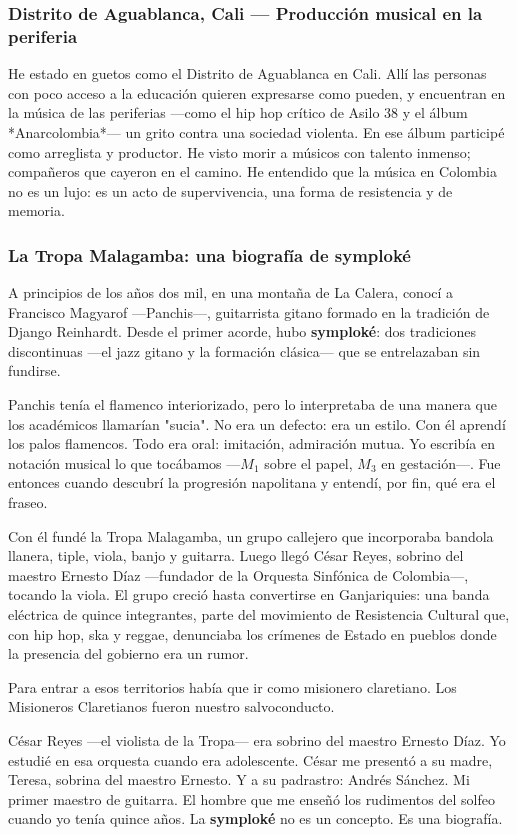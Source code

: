 \documentclass[14pt, a4paper]{article}
\begin{document}
\subsubsection{Distrito de Aguablanca, Cali — Producción musical en la periferia}
\label{aguablanca}
He estado en guetos como el Distrito de Aguablanca en Cali. Allí las
personas con poco acceso a la educación quieren expresarse como
pueden, y encuentran en la música de las periferias —como el hip hop
crítico de Asilo 38 y el álbum *Anarcolombia*— un grito contra una
sociedad violenta. En ese álbum participé como arreglista y productor.
He visto morir a músicos con talento inmenso; compañeros que cayeron
en el camino. He entendido que la música en Colombia no es un lujo:
es un acto de supervivencia, una forma de resistencia y de memoria.
\subsubsection{La Tropa Malagamba: una biografía de \textbf{symploké}}
\label{tropa-malagamba}
A principios de los años dos mil, en una montaña de La Calera, conocí
a Francisco Magyarof —Panchis—, guitarrista gitano formado en la
tradición de Django Reinhardt. Desde el primer acorde, hubo
\textbf{symploké}: dos tradiciones discontinuas —el jazz gitano y la
formación clásica— que se entrelazaban sin fundirse.

Panchis tenía el flamenco interiorizado, pero lo interpretaba de una
manera que los académicos llamarían "sucia". No era un defecto: era
un estilo. Con él aprendí los palos flamencos. Todo era oral:
imitación, admiración mutua. Yo escribía en notación musical lo que
tocábamos —\(M_1\) sobre el papel, \(M_3\) en gestación—. Fue entonces
cuando descubrí la progresión napolitana y entendí, por fin, qué era
el fraseo.

Con él fundé la Tropa Malagamba, un grupo callejero que incorporaba
bandola llanera, tiple, viola, banjo y guitarra. Luego llegó César
Reyes, sobrino del maestro Ernesto Díaz —fundador de la Orquesta
Sinfónica de Colombia—, tocando la viola. El grupo creció hasta
convertirse en Ganjariquies: una banda eléctrica de quince
integrantes, parte del movimiento de Resistencia Cultural que, con
hip hop, ska y reggae, denunciaba los crímenes de Estado en pueblos
donde la presencia del gobierno era un rumor.

Para entrar a esos territorios había que ir como misionero
claretiano. Los Misioneros Claretianos fueron nuestro salvoconducto.

César Reyes —el violista de la Tropa— era sobrino del maestro Ernesto
Díaz. Yo estudié en esa orquesta cuando era adolescente. César me
presentó a su madre, Teresa, sobrina del maestro Ernesto. Y a su
padrastro: Andrés Sánchez. Mi primer maestro de guitarra. El hombre
que me enseñó los rudimentos del solfeo cuando yo tenía quince años.
La \textbf{symploké} no es un concepto. Es una biografía.
\end{document}
